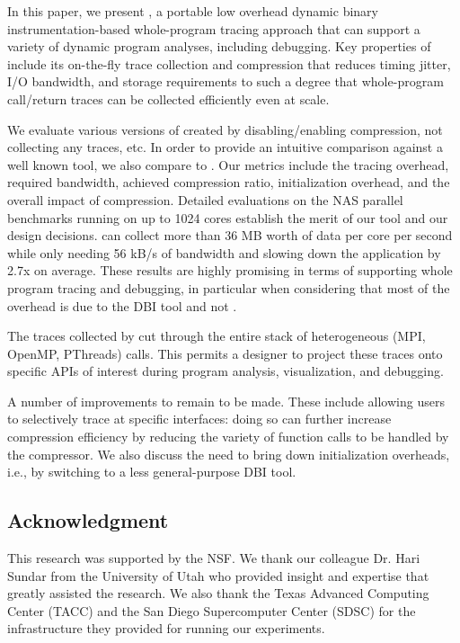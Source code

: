 
In this paper,
we present \parlot, a portable low overhead dynamic
binary instrumentation-based
whole-program
tracing approach that can support a variety of
dynamic program analyses, including debugging.
%
Key properties of \parlot include its on-the-fly trace collection and
compression that reduces timing jitter, I/O bandwidth, and storage requirements to such a degree that whole-program call/return traces can be collected efficiently even at scale.

We evaluate various versions of \parlot
created by disabling/enabling compression, not collecting any traces, etc.
%
In order to provide an intuitive comparison against a well known tool,
we also compare \parlot to \callgrind.
%
Our metrics include the tracing overhead, required bandwidth, achieved compression ratio, initialization overhead, and the
overall impact of compression.
%
Detailed evaluations on the NAS parallel benchmarks running on
up to 1024 cores establish the merit of our tool and our design decisions.
\parlot can collect more than 36 MB worth of data per core per second while
only needing 56 kB/s of bandwidth and slowing down the
application by 2.7x on average.
%
These results are highly promising in terms of supporting
whole program tracing and debugging, in particular when considering that most of the overhead is due to the DBI tool and not \parlot.


The traces collected by \parlot cut through the entire stack of heterogeneous
(MPI, OpenMP, PThreads) calls.
%
This permits a designer to project these traces onto specific
APIs of interest during program analysis, visualization, and debugging.
%


A number of improvements to \parlot remain to be made.
%
These include allowing users to selectively trace at specific
interfaces: doing so can further increase compression efficiency
by reducing the variety of function calls to be handled by
the compressor.
%
We also discuss the need to bring down initialization overheads, i.e.,
by switching to a less general-purpose DBI tool.
%



\subsection{Acknowledgment}

This research was supported by the NSF. We thank our colleague Dr. Hari Sundar from the University of Utah who provided insight and expertise that greatly assisted the research. We also thank the Texas Advanced Computing Center (TACC) and the San Diego Supercomputer Center (SDSC) for the infrastructure they provided for running our experiments.



